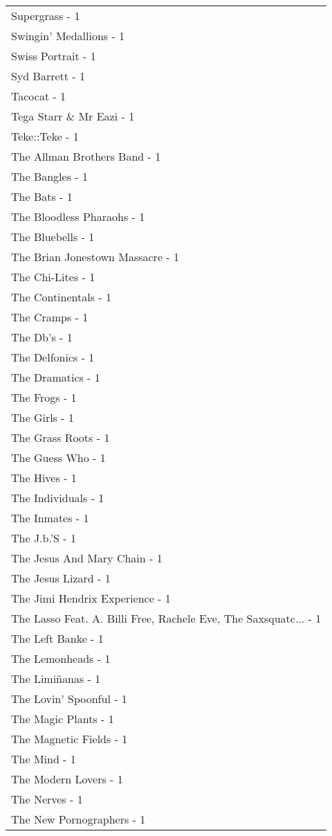 \documentclass[
]{article}
\begin{document}
\begin{longtable}{l}
Supergrass - 1 \\ 
Swingin' Medallions - 1 \\ 
Swiss Portrait - 1 \\ 
Syd Barrett - 1 \\ 
Tacocat - 1 \\ 
Tega Starr \& Mr Eazi - 1 \\ 
Teke::Teke - 1 \\ 
The Allman Brothers Band - 1 \\ 
The Bangles - 1 \\ 
The Bats - 1 \\ 
The Bloodless Pharaohs - 1 \\ 
The Bluebells - 1 \\ 
The Brian Jonestown Massacre - 1 \\ 
The Chi-Lites - 1 \\ 
The Continentals - 1 \\ 
The Cramps - 1 \\ 
The Db's - 1 \\ 
The Delfonics - 1 \\ 
The Dramatics - 1 \\ 
The Frogs - 1 \\ 
The Girls - 1 \\ 
The Grass Roots - 1 \\ 
The Guess Who - 1 \\ 
The Hives - 1 \\ 
The Individuals - 1 \\ 
The Inmates - 1 \\ 
The J.b.'S - 1 \\ 
The Jesus And Mary Chain - 1 \\ 
The Jesus Lizard - 1 \\ 
The Jimi Hendrix Experience - 1 \\ 
The Lasso Feat. A. Billi Free, Rachele Eve, The Saxsquatc... - 1 \\ 
The Left Banke - 1 \\ 
The Lemonheads - 1 \\ 
The Limiñanas - 1 \\ 
The Lovin' Spoonful - 1 \\ 
The Magic Plants - 1 \\ 
The Magnetic Fields - 1 \\ 
The Mind - 1 \\ 
The Modern Lovers - 1 \\ 
The Nerves - 1 \\ 
The New Pornographers - 1 \\ 

\end{longtable}
\end{document}
